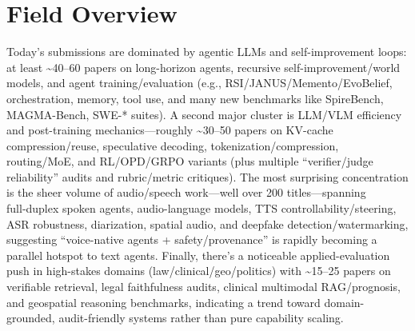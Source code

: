 \documentclass[12pt,letterpaper]{article}
\begin{document}
\section*{Field Overview}
{\footnotesize Today's submissions are dominated by agentic LLMs and self-improvement loops: at least \textasciitilde{}40--60 papers on long-horizon agents, recursive self-improvement/world models, and agent training/evaluation (e.g., RSI/JANUS/Memento/EvoBelief, orchestration, memory, tool use, and many new benchmarks like SpireBench, MAGMA-Bench, SWE-* suites). A second major cluster is LLM/VLM efficiency and post-training mechanics---roughly \textasciitilde{}30--50 papers on KV-cache compression/reuse, speculative decoding, tokenization/compression, routing/MoE, and RL/OPD/GRPO variants (plus multiple ``verifier/judge reliability'' audits and rubric/metric critiques). The most surprising concentration is the sheer volume of audio/speech work---well over 200 titles---spanning full‑duplex spoken agents, audio-language models, TTS controllability/steering, ASR robustness, diarization, spatial audio, and deepfake detection/watermarking, suggesting ``voice-native agents + safety/provenance'' is rapidly becoming a parallel hotspot to text agents. Finally, there's a noticeable applied-evaluation push in high-stakes domains (law/clinical/geo/politics) with \textasciitilde{}15--25 papers on verifiable retrieval, legal faithfulness audits, clinical multimodal RAG/prognosis, and geospatial reasoning benchmarks, indicating a trend toward domain-grounded, audit-friendly systems rather than pure capability scaling.}
\end{document}
